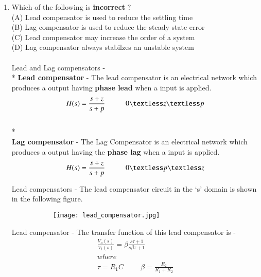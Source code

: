 \begin{enumerate}[label=\thesection.\arabic*.,ref=\thesection.\theenumi]
\item Which of the following is \textbf{incorrect} ?\\
(A) Lead compensator is used to reduce the settling time\\
(B) Lag compensator is used to reduce the steady state error\\
(C) Lead compensator may increase the order of a system\\
(D) Lag compensator always stabilzes an unstable system\\
\\
\solution Lead and Lag compensators - 
\\* \textbf{Lead compensator } - The lead compensator is an electrical network which produces a output having \textbf{phase lead} when a input is applied. 
\\
\begin{equation}
H(s) = \frac{s+z}{s+p}  \hspace{1cm} 0 \textless z \textless p
\centering
\end{equation}
\\* \textbf{\\Lag compensator} - The Lag Compensator is an electrical network which produces a  output having the \textbf{phase lag} when a input is applied.
\begin{equation}
H(s) = \frac{s+z}{s+p}  \hspace{1cm} 0 \textless p \textless z
\centering
\end{equation}


Lead compensators - 
The lead compensator circuit in the ‘s’ domain is shown in the following figure.
 
\begin{figure}[h]
 
\begin{subfigure}{0.5\textwidth}
\texttt{[image: lead\_compensator.jpg]} 
\label{fig:subim1}
\end{subfigure}
\end{figure}


Lead compensator - 
The transfer function of this lead compensator is -
\begin{align}
    \frac{V_o(s)}{V_i(s)} = \beta  \frac{s \tau +1}{s\beta \tau +1} \\
where\\
\tau = R_1C \hspace{1cm} \beta =\frac{R_2}{R_1+R_2}
\end{align}


\end{enumerate}
